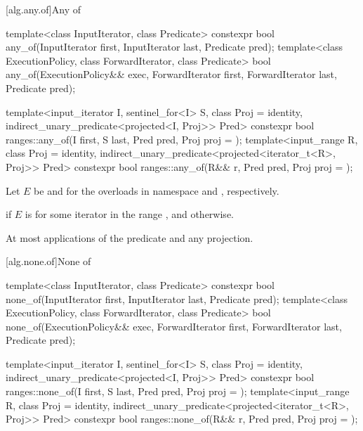 [alg.any.of]{Any of}

%
\begin{itemdecl}
template<class InputIterator, class Predicate>
  constexpr bool any_of(InputIterator first, InputIterator last, Predicate pred);
template<class ExecutionPolicy, class ForwardIterator, class Predicate>
  bool any_of(ExecutionPolicy&& exec, ForwardIterator first, ForwardIterator last,
              Predicate pred);

template<input_iterator I, sentinel_for<I> S, class Proj = identity,
         indirect_unary_predicate<projected<I, Proj>> Pred>
  constexpr bool ranges::any_of(I first, S last, Pred pred, Proj proj = {});
template<input_range R, class Proj = identity,
         indirect_unary_predicate<projected<iterator_t<R>, Proj>> Pred>
  constexpr bool ranges::any_of(R&& r, Pred pred, Proj proj = {});
\end{itemdecl}

\begin{itemdescr}
\pnum
Let $E$ be  and 
for the overloads in namespace  and , respectively.

\pnum
\returns
{} if $E$ is  for some iterator 
in the range , and  otherwise.

\pnum
\complexity
At most  applications of the predicate
and any projection.
\end{itemdescr}

[alg.none.of]{None of}

%
\begin{itemdecl}
template<class InputIterator, class Predicate>
  constexpr bool none_of(InputIterator first, InputIterator last, Predicate pred);
template<class ExecutionPolicy, class ForwardIterator, class Predicate>
  bool none_of(ExecutionPolicy&& exec, ForwardIterator first, ForwardIterator last,
               Predicate pred);

template<input_iterator I, sentinel_for<I> S, class Proj = identity,
         indirect_unary_predicate<projected<I, Proj>> Pred>
  constexpr bool ranges::none_of(I first, S last, Pred pred, Proj proj = {});
template<input_range R, class Proj = identity,
         indirect_unary_predicate<projected<iterator_t<R>, Proj>> Pred>
  constexpr bool ranges::none_of(R&& r, Pred pred, Proj proj = {});
\end{itemdecl}

